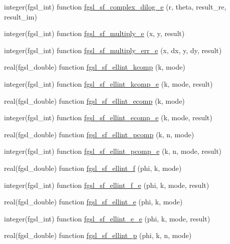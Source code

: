\begin{DoxyCompactItemize}
integer(fgsl\-\_\-int) function \hyperlink{specfunc_8finc_a22e46d53082bc5cd7b95310ab4015de3}{fgsl\-\_\-sf\-\_\-complex\-\_\-dilog\-\_\-e} (r, theta, result\-\_\-re, result\-\_\-im)
\item 
integer(fgsl\-\_\-int) function \hyperlink{specfunc_8finc_a88051ba6dc239deaf189aa04bec6c760}{fgsl\-\_\-sf\-\_\-multiply\-\_\-e} (x, y, result)
\item 
integer(fgsl\-\_\-int) function \hyperlink{specfunc_8finc_aa3906e99af0b3d5ebb5c7132916e564f}{fgsl\-\_\-sf\-\_\-multiply\-\_\-err\-\_\-e} (x, dx, y, dy, result)
\item 
real(fgsl\-\_\-double) function \hyperlink{specfunc_8finc_a0fd9b9da6309c4124ac958c8dc07985d}{fgsl\-\_\-sf\-\_\-ellint\-\_\-kcomp} (k, mode)
\item 
integer(fgsl\-\_\-int) function \hyperlink{specfunc_8finc_a35bddb22f495db07473338a26554b2ee}{fgsl\-\_\-sf\-\_\-ellint\-\_\-kcomp\-\_\-e} (k, mode, result)
\item 
real(fgsl\-\_\-double) function \hyperlink{specfunc_8finc_ab7b235eeba115f0001b16727b60956f0}{fgsl\-\_\-sf\-\_\-ellint\-\_\-ecomp} (k, mode)
\item 
integer(fgsl\-\_\-int) function \hyperlink{specfunc_8finc_a94f1b4905d619abdcc0f096bbbbb3cd7}{fgsl\-\_\-sf\-\_\-ellint\-\_\-ecomp\-\_\-e} (k, mode, result)
\item 
real(fgsl\-\_\-double) function \hyperlink{specfunc_8finc_a55ce744a4ed005e9a3d61ac70ce54650}{fgsl\-\_\-sf\-\_\-ellint\-\_\-pcomp} (k, n, mode)
\item 
integer(fgsl\-\_\-int) function \hyperlink{specfunc_8finc_a5f126c30a9ef61fcb6a5e1c01cf56cb5}{fgsl\-\_\-sf\-\_\-ellint\-\_\-pcomp\-\_\-e} (k, n, mode, result)
\item 
real(fgsl\-\_\-double) function \hyperlink{specfunc_8finc_a792cb2852a913e6f3fd37c58b7907ee2}{fgsl\-\_\-sf\-\_\-ellint\-\_\-f} (phi, k, mode)
\item 
integer(fgsl\-\_\-int) function \hyperlink{specfunc_8finc_af79d3fb7872a2c40ee25553c4c209a23}{fgsl\-\_\-sf\-\_\-ellint\-\_\-f\-\_\-e} (phi, k, mode, result)
\item 
real(fgsl\-\_\-double) function \hyperlink{specfunc_8finc_a286872eeaa9701d0de36ee03a1e9ecff}{fgsl\-\_\-sf\-\_\-ellint\-\_\-e} (phi, k, mode)
\item 
integer(fgsl\-\_\-int) function \hyperlink{specfunc_8finc_a7546a3ed0428be3886c947823fbb54d5}{fgsl\-\_\-sf\-\_\-ellint\-\_\-e\-\_\-e} (phi, k, mode, result)
\item 
real(fgsl\-\_\-double) function \hyperlink{specfunc_8finc_ac0e8d59bbbbf84452cdefb65cf1dc38c}{fgsl\-\_\-sf\-\_\-ellint\-\_\-p} (phi, k, n, mode)

\end{DoxyCompactItemize}
